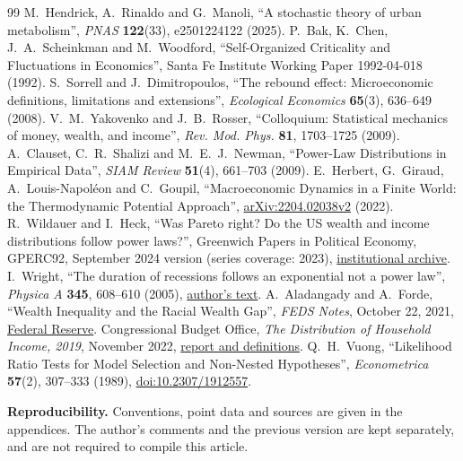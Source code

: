 \documentclass[10pt,a4paper,twocolumn]{article}
\begin{document}
\vspace{0.3cm}

\FloatBarrier
\clearpage
\begin{thebibliography}{99}\small
{} M.~Hendrick, A.~Rinaldo and G.~Manoli,
  ``A stochastic theory of urban metabolism'', \emph{PNAS} \textbf{122}(33),
  e2501224122 (2025).
 P.~Bak, K.~Chen, J.~A.~Scheinkman and M.~Woodford,
  ``Self-Organized Criticality and Fluctuations in Economics'',
  Santa Fe Institute Working Paper 1992-04-018 (1992).
 S.~Sorrell and J.~Dimitropoulos,
  ``The rebound effect: Microeconomic definitions, limitations and extensions'',
  \emph{Ecological Economics} \textbf{65}(3), 636--649 (2008).
 V.~M.~Yakovenko and J.~B.~Rosser,
  ``Colloquium: Statistical mechanics of money, wealth, and income'',
  \emph{Rev. Mod. Phys.} \textbf{81}, 1703--1725 (2009).
 A.~Clauset, C.~R.~Shalizi and M.~E.~J.~Newman,
  ``Power-Law Distributions in Empirical Data'', \emph{SIAM Review}
  \textbf{51}(4), 661--703 (2009).
 E.~Herbert, G.~Giraud, A.~Louis-Napol\'eon and C.~Goupil,
  ``Macroeconomic Dynamics in a Finite World: the Thermodynamic Potential
  Approach'', \href{https://arxiv.org/abs/2204.02038v2}{arXiv:2204.02038v2} (2022).
 R.~Wildauer and I.~Heck,
  ``Was Pareto right? Do the US wealth and income distributions follow power
  laws?'', Greenwich Papers in Political Economy, GPERC92, September 2024
  version (series coverage: 2023),
  \href{https://gala.gre.ac.uk/id/eprint/38597/}{institutional archive}.
 I.~Wright, ``The duration of recessions follows an
  exponential not a power law'', \emph{Physica A} \textbf{345}, 608--610
  (2005), \href{https://arxiv.org/abs/cond-mat/0311585}{author's text}.
 A.~Aladangady and A.~Forde, ``Wealth Inequality and the
  Racial Wealth Gap'', \emph{FEDS Notes}, October 22, 2021,
  \href{https://www.federalreserve.gov/econres/notes/feds-notes/wealth-inequality-and-the-racial-wealth-gap-20211022.html}{Federal Reserve}.
 Congressional Budget Office, \emph{The Distribution of
  Household Income, 2019}, November 2022,
  \href{https://www.cbo.gov/publication/58781}{report and definitions}.
 Q.~H.~Vuong, ``Likelihood Ratio Tests for Model Selection
  and Non-Nested Hypotheses'', \emph{Econometrica} \textbf{57}(2),
  307--333 (1989), \href{https://doi.org/10.2307/1912557}{doi:10.2307/1912557}.
\end{thebibliography}

\noindent\textbf{Reproducibility.} Conventions, point data and sources
are given in the appendices. The author's comments and the previous
version are kept separately, and are not required to compile this
article.
\clearpage

\end{document}
